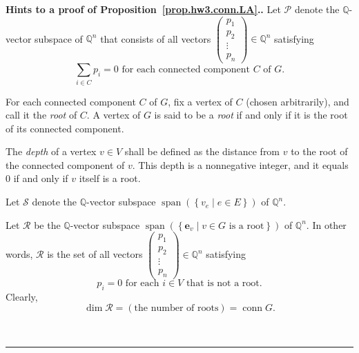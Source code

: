 \documentclass[numbers=enddot,12pt,final,onecolumn,notitlepage]{scrartcl}%
\theoremstyle{definition}
\newenvironment{proof}[1][Proof]{\noindent\textbf{#1.} }{\ \rule{0.5em}{0.5em}}
\let\sumnonlimits\sum
\renewcommand{\sum}{\sumnonlimits\limits}
\newcommand{\conn}{\operatorname{conn}}
\newcommand{\QQ}{\mathbb{Q}}
\newcommand{\set}[1]{\left\{ #1 \right\}}
\newcommand{\tup}[1]{\left( #1 \right)}
\newcommand{\spann}[1]{\operatorname{span}\left( #1 \right)}
\begin{document}
\begin{proof}[Hints to a proof of Proposition~\ref{prop.hw3.conn.LA}.]
Let $\mathcal{P}$ denote the $\QQ$-vector subspace of $\QQ^n$ that
consists of all vectors
$\left(
\begin{matrix} p_1 \\ p_2 \\ \vdots \\ p_n \end{matrix}
\right) \in \QQ^n$
satisfying
\begin{equation}
 \sum_{i \in C} p_i = 0
 \text{ for each connected component } C \text{ of } G .
\label{pf.prop.hw3.conn.LA.def-P}
\end{equation}

For each connected component $C$ of $G$, fix a vertex of $C$
(chosen arbitrarily), and call it the \textit{root} of $C$.
A vertex of $G$ is said to be a \textit{root} if and only if
it is the root of its connected component.

The \textit{depth} of a vertex $v \in V$ shall be defined as
the distance from $v$ to the root of the connected component
of $v$.
This depth is a nonnegative integer, and it equals $0$ if and
only if $v$ itself is a root.

Let $\mathcal{S}$ denote the $\QQ$-vector subspace
$\spann{\set{v_e \mid e \in E}}$ of $\QQ^n$.

Let $\mathcal{R}$ be the $\QQ$-vector subspace
$\spann{\set{\mathbf{e}_v \mid v \in G \text{ is a root}}}$
of $\QQ^n$.
In other words, $\mathcal{R}$ is the set of all vectors
$\left(
\begin{matrix} p_1 \\ p_2 \\ \vdots \\ p_n \end{matrix}
\right) \in \QQ^n$
satisfying
\begin{equation}
 p_i = 0
 \text{ for each } i \in V \text{ that is not a root}.
\label{pf.prop.hw3.conn.LA.def-R}
\end{equation}
Clearly,
\[
\dim \mathcal{R} = \tup{\text{the number of roots}}
= \conn G.
\]


\end{proof}
\end{document}
